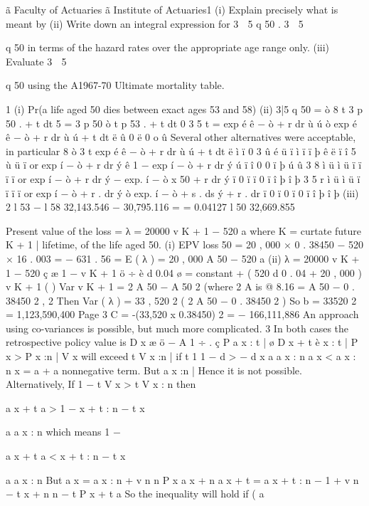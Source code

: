 \documentclass[a4paper,12pt]{article}
\begin{document}
ã Faculty of Actuaries
ã Institute of Actuaries1
(i) Explain precisely what is meant by
(ii) Write down an integral expression for
3  5
q 50 .
3  5

q 50 in terms of the hazard rates
over the appropriate age range only.
(iii)
Evaluate
3  5

q 50 using the A1967-70 Ultimate mortality table.



1
(i) Pr(a life aged 50 dies between exact ages 53 and 58)
(ii) 3|5 q 50
= ò
8
t
3
p 50 .  + t dt
5
= 3 p 50 ò t p 53 .  + t dt
0
3
5
t
= exp é ê − ò  + r dr ù ú ò exp é ê − ò  + r dr ù ú  + t dt
ë
û
0
ë
0
o
û
Several other alternatives were acceptable, in particular
8
ò 3
t
exp é ê − ò  + r dr ù ú  + t dt
ë
ì
ï
0
3
û
é
ü
ï ì
ï
ï
þ ê
ë ï
î
5
ù
ü
ï
or exp í − ò  + r dr ý ê 1 − exp í − ò  + r dr ý ú
ï
î
0
0
ï
þ ú
û
3
8
ì
ü
ì
ü
ï
ï
ï
ï
or exp í − ò  + r dr ý − exp. í − ò \mu x 50 + r dr ý
ï 0
ï
ï 0
ï
î
þ
î
þ
3
5
r
ì
ü
ì
ü
ï
ï
ï
ï
or exp í − ò  + r . dr ý ò exp. í − ò  + s . ds ý  + r . dr
ï 0
ï 0
ï 0
ï
î
þ
î
þ
(iii)
2
l 53 − l 58 32,143.546 − 30,795.116
=
= 0.04127
l 50
32,669.855
 
Present value of the loss = λ = 20000 v K + 1 − 520 a
where K = curtate future
K + 1 |
lifetime, of the life aged 50.
(i) EPV loss
  50 = 20 , 000 × 0 . 38450 − 520 × 16 . 003 = − 631 . 56
= Ε ( λ ) = 20 , 000 A 50 − 520 a
(ii) λ = 20000 v K + 1 − 520 ç
æ 1 − v K + 1 ö
÷
è d 0.04 ø
= constant + ( 520 d 0 . 04 + 20 , 000 ) v K + 1
(
)
Var v K + 1 = 2 A 50 − A 50 2 (where 2 A is @ 8.16%
= A 50 − 0 . 38450 2 ,
2
Then Var ( λ ) = 33 , 520 2
(
2
A 50 − 0 . 38450 2
)
So b = 33520 2 = 1,123,590,400
Page 3%
C = -(33,520 x 0.38450) 2 = − 166,111,886
An approach using co-variances is possible, but much more complicated.
3
In both cases the retrospective policy value is
D x æ
ö
  − A 1 ÷ .
ç P a
x : t | ø
D x + t è x : t |
P x > P x :n |
V x will exceed t V x :n | if
t
1
1
− d >
− d
 x
a
a  x : n
a  x < a  x : n
  x = a
  + a nonnegative term.
But a
x :n |
Hence it is not possible.
Alternatively,
If
1 −
t V x
> t V x : n then

a
 x + t
a
> 1 − x + t : n − t
 x

a
a
x : n
which means
1 −

a
 x + t
a
< x + t : n − t
 x

a
a
x : n
But a  x = a  x : n + v n n P x a  x + n
a  x + t = a  x + t : n − 1 + v n − t
 x + n
n − t P x + t a
So the inequality will hold if
( a
\end{document}
